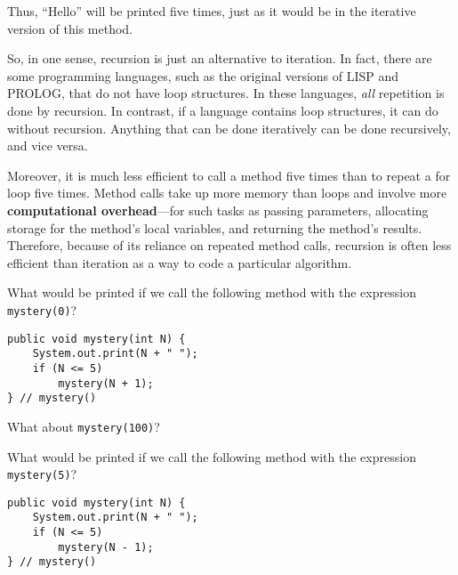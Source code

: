 \noindent Thus, ``Hello'' will be printed five times, just as
it would be in the iterative version of this method.

So, in one sense, recursion is just an alternative to iteration.  In
fact, there are some programming languages, such as the original
versions of LISP and PROLOG, that do not have loop structures.  In
these languages, {\it all} repetition is done by recursion.  In
contrast, if a language contains loop structures, it can do without
recursion.  Anything that can be done iteratively can be done
recursively, and vice versa.

Moreover, it is much less efficient to call a method five times than to
repeat a for loop five times.  Method calls take up more memory than
loops and involve more {\bf computational overhead}---for such tasks
as passing parameters, allocating storage for the method's local
variables, and returning the method's results.   Therefore, because of
its reliance on repeated method calls, recursion is often less
efficient than iteration as a way to code a particular algorithm.



\pagebreak
{}
\begin{SSTUDY}
\item  What would be printed if we call the following method with
the expression {\tt mystery(0)}? 

\begin{jjjlisting}
\begin{lstlisting}
public void mystery(int N) {
    System.out.print(N + " ");
    if (N <= 5)
        mystery(N + 1);
} // mystery()
\end{lstlisting}
\end{jjjlisting}

\noindent What about {\tt mystery(100)}?

\item  What would be printed if we call the following method with
the expression {\tt mystery(5)}?

\begin{jjjlisting}
\begin{lstlisting}
public void mystery(int N) {
    System.out.print(N + " ");
    if (N <= 5)
        mystery(N - 1);
} // mystery()
\end{lstlisting}
\end{jjjlisting}

\end{SSTUDY}


